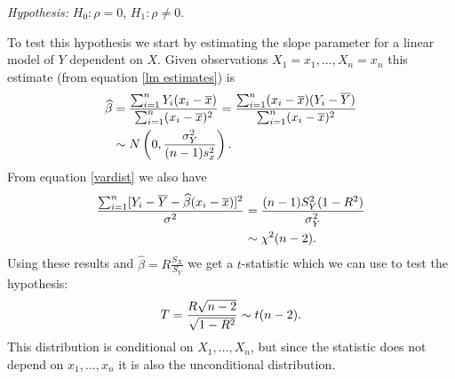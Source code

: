 \documentclass[10pt, two column]{article}
\begin{document}
\emph{Hypothesis:} $H_{0} : \rho = 0$, $H_{1} : \rho \neq 0$. 

To test this hypothesis we start by estimating the slope parameter for a linear model of $Y$ dependent on $X$. Given observations $X_{1} = x_{1}, \dots, X_{n} = x_{n}$ this estimate (from equation \eqref{lm estimates}) is \vspace{-5pt}
\begin{align*} 
\widehat{\beta} &= \frac{\sum_{i=1}^{n} Y_{i}(x_{i} - \overline{x})}{\sum_{i=1}^{n} (x_{i} - \overline{x})^{2}} = \frac{\sum_{i=1}^{n} (x_{i} - \overline{x})(Y_{i} - \overline{Y})}{\sum_{i=1}^{n} (x_{i} - \overline{x})^{2}} \\
&\sim N\left( 0, \frac{\sigma_{Y}^{2}}{(n-1)s_{x}^{2}}\right). \vspace{-5pt}
\end{align*} 
From equation \eqref{vardist} we also have \vspace{-5pt}
\begin{align*}
\frac{\sum_{i=1}^{n} [Y_{i} - \overline{Y} - \widehat{\beta}(x_{i} - \overline{x})]^{2}}{\sigma^{2}} &=  \frac{(n-1) S_{Y}^{2} (1 - R^{2})}{\sigma_{Y}^{2}} \\
&\sim \chi^{2}(n-2). \vspace{-5pt}
\end{align*}
Using these results and $\widehat{\beta} = R \frac{S_{X}}{S_{Y}}$ we get a $t$-statistic which we can use to test the hypothesis: \vspace{-5pt}
\[
T = \frac{R\sqrt{n-2}}{\sqrt{1 - R^{2}}} \sim t(n-2). \vspace{-5pt}
\]
This distribution is conditional on $X_{1}, \dots, X_{n}$, but since the statistic does not depend on $x_{1}, \dots, x_{n}$ it is also the unconditional distribution. 
\end{document}
